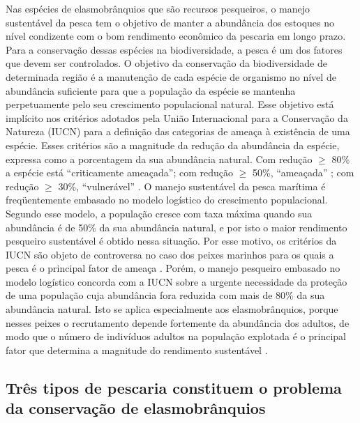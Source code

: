 \documentclass[a4paper,11pt,twoside,showtrims,onecolumn,openright,final]{memoir}
\begin{document}
Nas espécies de elasmobrânquios que são recursos pesqueiros, o manejo sustentável 
da pesca tem o objetivo de manter a abundância dos estoques no nível condizente 
com o bom rendimento econômico da pescaria em longo prazo. Para a conservação dessas 
espécies na biodiversidade, a pesca é um dos fatores que devem ser controlados. 
O objetivo da conservação da biodiversidade de determinada região é a manutenção de cada 
espécie de organismo no nível de abundância suficiente para que a população da espécie se 
mantenha perpetuamente pelo seu crescimento populacional natural. Esse objetivo está implícito 
nos critérios adotados pela União Internacional para a Conservação da Natureza (IUCN) 
para a definição das categorias de ameaça à existência de uma espécie. Esses critérios 
são a magnitude da redução da abundância da espécie, expressa como a porcentagem  da  
sua abundância natural. Com redução $\geq$ 80\% a espécie está ``criticamente ameaçada''; 
com redução $\geq$ 50\%, ``ameaçada'' ; com redução $\geq$ 30\%, ``vulnerável'' \citep{MACE1991}. %
O manejo sustentável da pesca marítima é freqüentemente embasado no modelo logístico do crescimento 
populacional. Segundo esse modelo, a população cresce com taxa máxima quando sua abundância é de 50\% 
da sua abundância natural, e por isto o maior rendimento pesqueiro sustentável é obtido nessa situação. 
Por esse motivo, os critérios da IUCN são objeto de controversa no caso dos peixes marinhos para os 
quais a pesca é o principal fator de ameaça \citep{dulvy2003}. %
Porém, o manejo pesqueiro embasado no modelo logístico concorda com a IUCN sobre a urgente necessidade 
da proteção de uma população cuja abundância fora reduzida com mais de 80\% da sua abundância natural. 
Isto se aplica  especialmente aos elasmobrânquios, porque nesses peixes o recrutamento depende 
fortemente da abundância dos adultos, de modo que o número de indivíduos adultos na população 
explotada é o principal fator que determina a magnitude do rendimento sustentável \citep{camhi1998}. %


\subsection*{Três tipos de pescaria constituem o problema da conservação de elasmobrânquios}
\end{document}
